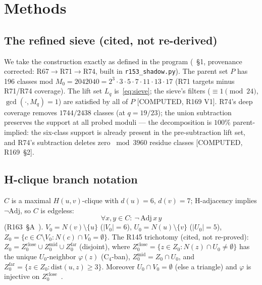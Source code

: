 \documentclass[11pt,a4paper]{article}
\theoremstyle{definition}
\begin{document}
\section{Methods}

\subsection{The refined sieve (cited, not re-derived)}

We take the construction exactly as defined in the program
(\cite{R169}~\S1, provenance corrected: R67$\to$R71$\to$R74, built in
\texttt{r153\_shadow.py}). The parent set $P$ has 196 classes mod
$M_0=2042040=2^3\cdot3\cdot5\cdot7\cdot11\cdot13\cdot17$ (R71 targets
minus R71/R74 coverage). The lift set $L_q$ is~\eqref{eq:sieve}; the
sieve's filters ($\equiv1\pmod{24}$, $\gcd(\cdot,M_q)=1$) are satisfied
by all of $P$ [COMPUTED, R169 V1]. R74's deep coverage removes
$1744/2438$ classes (at $q=19/23$); the union subtraction preserves the
support at all probed moduli --- the decomposition is $100\%$
parent-implied: the six-class support is already present in the
pre-subtraction lift set, and R74's subtraction deletes zero
$\bmod 3960$ residue classes [COMPUTED, R169~\S2].

\subsection{H-clique branch notation}

$C$ is a maximal $H(u,v)$-clique with $d(u)=6$, $d(v)=7$; H-adjacency
implies $\neg\mathrm{Adj}$, so $C$ is edgeless:
\begin{equation}
  \label{eq:hclique}
  \forall x,y\in C:\ \neg\,\mathrm{Adj}\,x\,y
\end{equation}
(R163~\S A~\cite{R163}). $V_0=N(v)\setminus\{u\}$
($|V_0|=6$), $U_0=N(u)\setminus\{v\}$ ($|U_0|=5$),
$Z_0=\{c\in C\setminus V_0:N(c)\cap V_0=\emptyset\}$. The R145
trichotomy (cited, not re-proved): $Z_0=Z_0^{\mathrm{close}}\cup
Z_0^{\mathrm{mid}}\cup Z_0^{\mathrm{far}}$ (disjoint), where
$Z_0^{\mathrm{close}}=\{z\in Z_0:N(z)\cap U_0\neq\emptyset\}$ has the
unique $U_0$-neighbor $\varphi(z)$ (C$_4$-ban), $Z_0^{\mathrm{mid}}=
Z_0\cap U_0$, and $Z_0^{\mathrm{far}}=\{z\in Z_0:
\mathrm{dist}(u,z)\ge3\}$. Moreover $U_0\cap V_0=\emptyset$ (else a
triangle) and $\varphi$ is injective on
$Z_0^{\mathrm{close}}$~\cite{R145}.
\end{document}
